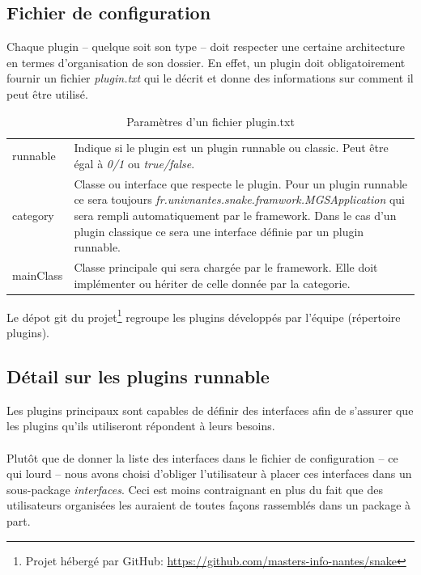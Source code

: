 \documentclass[12pt,a4paper]{article}
\begin{document}
\subsection{Fichier de configuration}
Chaque plugin -- quelque soit son type -- doit respecter une certaine architecture 
en termes d'organisation de son dossier. En effet, un plugin doit obligatoirement 
fournir un fichier \emph{plugin.txt} qui le décrit et donne des informations sur 
comment il peut être utilisé.

\begin{table}[h]\label{tab:plugintxt}
\centering
	\begin{tabular}{lp{10cm}}
		runnable & Indique si le plugin est un plugin runnable ou classic. 
		Peut être égal à \emph{0/1} ou \emph{true/false}.\\				
		
		category & Classe ou interface que respecte le plugin. Pour un plugin 
		runnable ce sera toujours \emph{fr.univnantes.snake.framwork.MGSApplication} 
		qui sera rempli automatiquement par le framework. Dans le cas d'un plugin 
		classique ce sera une interface définie par un plugin runnable.\\
		
		mainClass & Classe principale qui sera chargée par le framework. 
		Elle doit implémenter ou hériter de celle donnée par la categorie.\\
	\end{tabular}	
\caption{Paramètres d'un fichier plugin.txt}
\end{table}

Le dépot git du projet\footnote{Projet hébergé par GitHub: 
\href{github.com/masters-info-nantes/snake}
{https://github.com/masters-info-nantes/snake}} regroupe les plugins développés 
par l'équipe (répertoire plugins).

\subsection{Détail sur les plugins runnable}\label{sss:DetailsRunnable}
Les plugins principaux sont capables de définir des interfaces afin de s'assurer 
que les plugins qu'ils utiliseront répondent à leurs besoins.
\\\\
Plutôt que de donner la liste des interfaces dans le fichier de configuration -- 
ce qui lourd -- nous avons choisi d'obliger l'utilisateur à placer ces interfaces 
dans un sous-package \emph{interfaces}. Ceci est moins contraignant en plus du 
fait que des utilisateurs organisées les auraient de toutes façons rassemblés 
dans un package à part.
\end{document}
